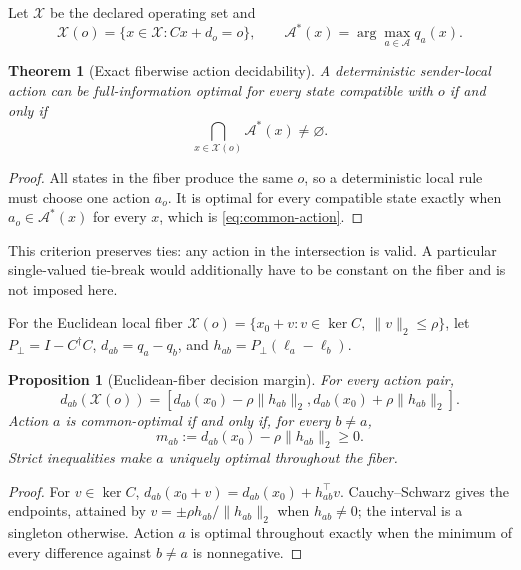 \documentclass[10pt,twocolumn,twoside]{IEEEtran}
\newtheorem{theorem}{Theorem}
\newtheorem{proposition}{Proposition}
\begin{document}
Let \(\mathcal X\) be the declared operating set and
\begin{equation}
\mathcal X(o)=\{x\in\mathcal X:Cx+d_o=o\},\qquad
\mathcal A^*(x)=\arg\max_{a\in\mathcal A}q_a(x).
\end{equation}

\begin{theorem}[Exact fiberwise action decidability]
\label{thm:common-action}
A deterministic sender-local action can be full-information optimal for every
state compatible with \(o\) if and only if
\begin{equation}
\bigcap_{x\in\mathcal X(o)}\mathcal A^*(x)\ne\varnothing.
\label{eq:common-action}
\end{equation}
\end{theorem}

\begin{proof}
All states in the fiber produce the same \(o\), so a deterministic local rule
must choose one action \(a_o\).  It is optimal for every compatible state
exactly when \(a_o\in\mathcal A^*(x)\) for every \(x\), which is
\eqref{eq:common-action}.
\end{proof}

This criterion preserves ties: any action in the intersection is valid.  A
particular single-valued tie-break would additionally have to be constant on
the fiber and is not imposed here.

For the Euclidean local fiber
\(\mathcal X(o)=\{x_0+v:v\in\ker C,\ \|v\|_2\le\rho\}\), let
\(P_\perp=I-C^\dagger C\),
\(d_{ab}=q_a-q_b\), and
\(h_{ab}=P_\perp(\ell_a-\ell_b)\).

\begin{proposition}[Euclidean-fiber decision margin]
\label{prop:fiber-margin}
For every action pair,
\begin{equation}
d_{ab}(\mathcal X(o))=
[d_{ab}(x_0)-\rho\|h_{ab}\|_2,
 d_{ab}(x_0)+\rho\|h_{ab}\|_2].
\label{eq:pairwise-interval}
\end{equation}
Action \(a\) is common-optimal if and only if, for every \(b\ne a\),
\begin{equation}
m_{ab}:=d_{ab}(x_0)-\rho\|h_{ab}\|_2\ge0.
\label{eq:common-margin}
\end{equation}
Strict inequalities make \(a\) uniquely optimal throughout the fiber.
\end{proposition}

\begin{proof}
For \(v\in\ker C\),
\(d_{ab}(x_0+v)=d_{ab}(x_0)+h_{ab}^\top v\).
Cauchy--Schwarz gives the endpoints, attained by
\(v=\pm\rho h_{ab}/\|h_{ab}\|_2\) when \(h_{ab}\ne0\); the interval is a
singleton otherwise.  Action \(a\) is optimal throughout exactly when the
minimum of every difference against \(b\ne a\) is nonnegative.
\end{proof}
\end{document}
